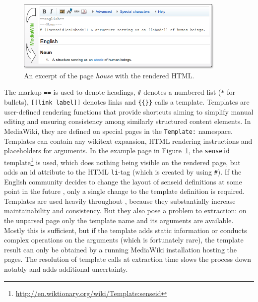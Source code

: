 \begin{figure}[tb]
\centering
\includegraphics[width=0.9\textwidth]{./images/wikitext.png}
\caption{An excerpt of the \wik page \textit{house} with the rendered HTML.}
\label{fig:wikitext}
\end{figure}

The markup \texttt{==} is used to denote headings, \texttt{\#} denotes a numbered list (\texttt{*} for bullets), \texttt{[[link label]]} denotes links and \texttt{\{\{\}\}} calls a template.
Templates are user-defined rendering functions that provide shortcuts aiming to simplify manual editing and ensuring consistency among similarly structured content elements. 
In MediaWiki, they are defined on special pages in the \texttt{Template:} namespace. 
Templates can contain any wikitext expansion, HTML rendering instructions and placeholders for arguments. 
In the example page in Figure~\ref{fig:wikitext}, the \texttt{senseid} template\footnote{\url{http://en.wiktionary.org/wiki/Template:senseid}} is used, which does nothing being visible on the rendered page, but adds an id attribute to the HTML \texttt{li}-tag (which is created by using \texttt{\#}).
If the English \wik community decides to change the layout of senseid definitions at some point in the future , only a single change to the template definition is required. 
Templates are used heavily throughout \wik, because they substantially increase maintainability and consistency. 
But they also pose a problem to extraction: on the unparsed page only the template name and its arguments are available.
Mostly this is sufficient, but if the template adds static information or conducts complex operations on the arguments (which is fortunately rare), the template result can only be obtained by a running MediaWiki installation hosting the pages. 
The resolution of template calls at extraction time slows the process down notably and adds additional uncertainty.

